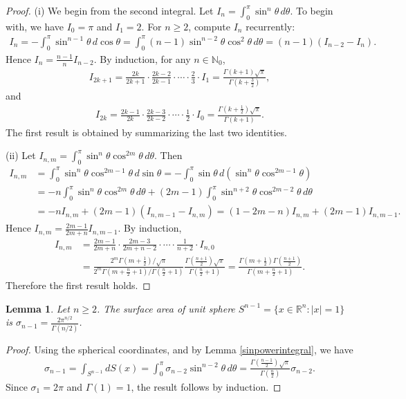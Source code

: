 \documentclass{article}
\numberwithin{equation}{section}
\newcommand{\bbN}{\mathbb{N}}
\newcommand{\bbR}{\mathbb{R}}
\theoremstyle{plain}
\newtheorem{lemma}[theorem]{Lemma}
\theoremstyle{definition}
\begin{document}
\begin{proof}
(i) We begin from the second integral. Let $I_n=\int_0^\pi\sin^n\theta\,d\theta$. To begin with, we have $I_0=\pi$ and $I_1=2$. For $n\geq 2$, compute $I_n$ recurrently:
\begin{align*}
	I_n=-\int_0^\pi\sin^{n-1}\theta\,d\cos\theta=\int_0^\pi(n-1)\sin^{n-2}\theta\cos^2\theta\,d\theta=(n-1)(I_{n-2}-I_n).
\end{align*}
Hence $I_n=\frac{n-1}{n}I_{n-2}$. By induction, for any $n\in\bbN_0$,
\begin{align*}
	I_{2k+1}=\frac{2k}{2k+1}\cdot\frac{2k-2}{2k-1}\cdot\cdots\cdot\frac{2}{3}\cdot I_1=\frac{\Gamma\left(k+1\right)\sqrt{\pi}}{\Gamma\left(k+\frac{3}{2}\right)},
\end{align*}
and
\begin{align*}
	I_{2k}=\frac{2k-1}{2k}\cdot\frac{2k-3}{2k-2}\cdot\cdots\cdot\frac{1}{2}\cdot I_0=\frac{\Gamma\left(k+\frac{1}{2}\right)\sqrt{\pi}}{\Gamma\left(k+1\right)}.
\end{align*}
The first result is obtained by summarizing the last two identities.

(ii) Let $I_{n,m}=\int_0^\pi\sin^n\theta\cos^{2m}\theta\,d\theta$. Then
\begin{align*}
	I_{n,m}&=\int_0^\pi\sin^n\theta\cos^{2m-1}\theta\,d\sin\theta=-\int_0^\pi\sin\theta\,d\left(\sin^n\theta\cos^{2m-1}\theta\right)\\
	&=-n\int_0^\pi\sin^n\theta\cos^{2m}\theta\,d\theta+(2m-1)\int_0^\pi\sin^{n+2}\theta\cos^{2m-2}\theta\,d\theta\\
	&=-nI_{n,m}+(2m-1)(I_{n,m-1}-I_{n,m})=(1-2m-n)I_{n,m}+(2m-1)I_{n,m-1}.
\end{align*}
Hence $I_{n,m}=\frac{2m-1}{2m+n}I_{n,m-1}$. By induction,
\begin{align*}
	I_{n,m}&=\frac{2m-1}{2m+n}\cdot\frac{2m-3}{2m+n-2}\cdot\cdots\cdot\frac{1}{n+2}\cdot I_{n,0}\\
	&=\frac{2^m\Gamma\left(m+\frac{1}{2}\right)/\sqrt{\pi}}{2^m\Gamma\left(m+\frac{n}{2}+1\right)/\Gamma\left(\frac{n}{2}+1\right)}\frac{\Gamma\left(\frac{n+1}{2}\right)\sqrt{\pi}}{\Gamma\left(\frac{n}{2}+1\right)}=\frac{\Gamma\left(m+\frac{1}{2}\right)\Gamma\left(\frac{n+1}{2}\right)}{\Gamma\left(m+\frac{n}{2}+1\right)}.
\end{align*}
Therefore the first result holds.
\end{proof}

\begin{lemma} Let $n\geq 2$. The surface area of unit sphere $S^{n-1}=\{x\in\bbR^n:\vert x\vert=1\}$ is $\sigma_{n-1}=\frac{2\pi^{n/2}}{\Gamma\left(n/2\right)}$.
\end{lemma}
\begin{proof}
Using the spherical coordinates, and by Lemma \ref{sinpowerintegral}, we have
\begin{align*}
	\sigma_{n-1}=\int_{S^{n-1}}dS(x)=\int_0^\pi\sigma_{n-2}\sin^{n-2}\theta\,d\theta=\frac{\Gamma\left(\frac{n-1}{2}\right)\sqrt{\pi}}{\Gamma\left(\frac{n}{2}\right)}\sigma_{n-2}.
\end{align*}
Since $\sigma_1=2\pi$ and $\Gamma(1)=1$, the result follows by induction. 
\end{proof}
\end{document}
